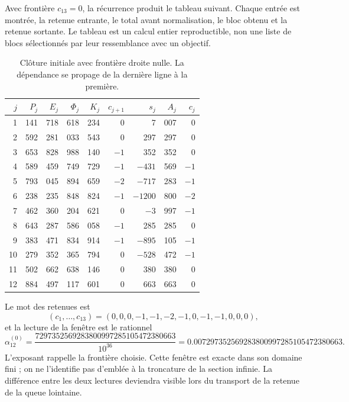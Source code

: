 Avec frontière \(c_{13}=0\), la récurrence produit le tableau suivant.
Chaque entrée est montrée, la retenue entrante, le total avant normalisation,
le bloc obtenu et la retenue sortante. Le tableau est un calcul entier
reproductible, non une liste de blocs sélectionnés par leur ressemblance avec
un objectif.

\begin{table}[htbp]
\centering
\small
\setlength{\tabcolsep}{3.5pt}
\begin{tabular}{r|rrrr|rr|rr}
\hline
\(j\)&\(P_j\)&\(E_j\)&\(\Phi_j\)&\(K_j\)&\(c_{j+1}\)&\(s_j\)&\(A_j\)&\(c_j\)\\
\hline
1&141&718&618&234&0&7&007&0\\
2&592&281&033&543&0&297&297&0\\
3&653&828&988&140&\(-1\)&352&352&0\\
4&589&459&749&729&\(-1\)&\(-431\)&569&\(-1\)\\
5&793&045&894&659&\(-2\)&\(-717\)&283&\(-1\)\\
6&238&235&848&824&\(-1\)&\(-1200\)&800&\(-2\)\\
7&462&360&204&621&0&\(-3\)&997&\(-1\)\\
8&643&287&586&058&\(-1\)&285&285&0\\
9&383&471&834&914&\(-1\)&\(-895\)&105&\(-1\)\\
10&279&352&365&794&0&\(-528\)&472&\(-1\)\\
11&502&662&638&146&0&380&380&0\\
12&884&497&117&601&0&663&663&0\\
\hline
\end{tabular}
\caption{Clôture initiale avec frontière droite nulle. La dépendance se propage de la dernière ligne à la première.}
\label{tab:alpha-ventana}
\end{table}

Le mot des retenues est
\[
 (c_1,\ldots,c_{13})=(0,0,0,-1,-1,-2,-1,0,-1,-1,0,0,0),
\]
et la lecture de la fenêtre est le rationnel
\begin{equation}
 \alpha_{12}^{(0)}
 =\frac{7297352569283800997285105472380663}{10^{36}}
 =0.007297352569283800997285105472380663.
 \label{eq:alpha-ventana-cero}
\end{equation}
L'exposant rappelle la frontière choisie. Cette fenêtre est exacte dans son
domaine fini ; on ne l'identifie pas d'emblée à la troncature de la
section infinie. La différence entre les deux lectures deviendra visible lors du
transport de la retenue de la queue lointaine.

